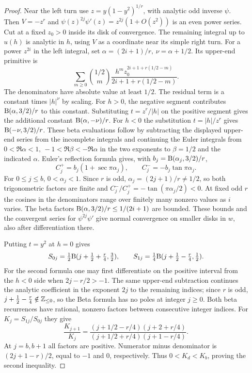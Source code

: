 \begin{proof}
Near the left turn use \(z=y(1-y^2)^{1/r}\), with analytic odd inverse \(\psi\).
Then \(V=-z^r\) and \(\psi(z)^{2j}\psi'(z)=z^{2j}(1+O(z^2))\) is an even power series. Cut at a fixed \(z_0>0\) inside its disk of convergence. The remaining integral up to \(u(h)\) is analytic in \(h\), using \(V\) as a coordinate near its simple right turn. For a power \(z^{2i}\) in the left integral, set \(\alpha=(2i+1)/r,\ \nu=\alpha+1/2\). Its upper-end primitive is
\[
 \sum_{m\ge0}\binom{1/2}{m}
 \frac{h^m z_0^{2i+1+r(1/2-m)}}{2i+1+r(1/2-m)} .
\]
The denominators have absolute value at least \(1/2\). The residual term is a constant times \(|h|^\nu\) by scaling. For \(h>0\), the negative segment contributes \(\mathrm{B}(\alpha,3/2)/r\) to this constant. Substituting \(t=z^r/|h|\) on the positive segment gives the additional constant \(\mathrm{B}(\alpha,-\nu)/r\). For \(h<0\) the substitution \(t=|h|/z^r\) gives \(\mathrm{B}(-\nu,3/2)/r\). These beta evaluations follow by subtracting the displayed upper-end series from the incomplete integrals and continuing the Euler integrals from \(0<\Re\alpha<1,\ -1<\Re\beta<-\Re\alpha\) in the two exponents to \(\beta=1/2\) and the indicated \(\alpha\). Euler's reflection formula gives, with \(b_j=\mathrm{B}(\alpha_j,3/2)/r\),
\[
 C_j^+=b_j(1+\sec\pi\alpha_j),\qquad C_j^-=-b_j\tan\pi\alpha_j .
\]
For \(0\le j\le b\), \(0<\alpha_j<1\). Since \(r\) is odd, \(\alpha_j=(2j+1)/r\ne1/2\), so both trigonometric factors are finite and \(C_j^-/C_j^+=-\tan(\pi\alpha_j/2)<0\).
At fixed odd \(r\) the cosines in the denominators range over finitely many nonzero values as \(i\) varies. The beta factors \(\mathrm{B}(\alpha,3/2)/r\le1/(2i+1)\) are bounded. These bounds and the convergent series for \(\psi^{2j}\psi'\) give normal convergence on smaller disks in \(w\), also after differentiation there.

Putting \(t=y^2\) at \(h=0\) gives
\[
 S_{0j}=\tfrac12\mathrm{B}(j+\tfrac12+\tfrac r4,\tfrac32),\qquad
 S_{1j}=\tfrac14\mathrm{B}(j+\tfrac12-\tfrac r4,\tfrac12).
\]
For the second formula one may first differentiate on the positive interval from the \(h<0\) side when \(2j-r/2>-1\). The same upper-end subtraction continues the analytic coefficient in the exponent \(2j\) to the remaining indices; since \(r\) is odd, \(j+\tfrac12-\tfrac r4\notin\mathbb{Z}_{\le0}\), so the Beta formula has no poles at integer \(j\ge0\). Both beta recurrences have rational, nonzero factors between consecutive integer indices. For \(K_j=S_{1j}/S_{0j}\) they give
\[
 \frac{K_{j+1}}{K_j}
 =\frac{(j+1/2-r/4)(j+2+r/4)}
        {(j+1/2+r/4)(j+1-r/4)} .
\]
At \(j=b,b+1\) all factors are positive. Numerator minus denominator is
\((2j+1-r)/2\), equal to \(-1\) and \(0\), respectively. Thus \(0<K_d<K_b\), proving the second inequality.
\end{proof}

